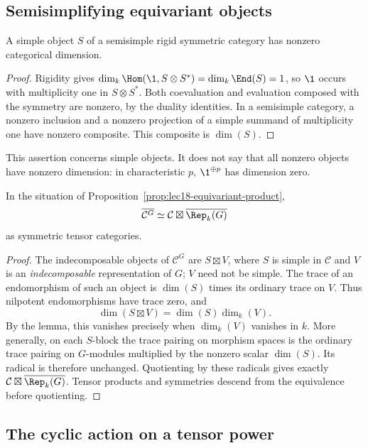 \subsection{Semisimplifying equivariant objects}

\begin{lemma}
A simple object $S$ of a semisimple rigid symmetric category has
nonzero categorical dimension.
\end{lemma}
\begin{proof}
Rigidity gives
$\dim_k\Hom(\1,S\otimes S^*)=\dim_k\End(S)=1$, so $\1$ occurs
with multiplicity one in $S\otimes S^*$. Both coevaluation and
evaluation composed with the symmetry are nonzero, by the duality
identities. In a semisimple category, a nonzero inclusion and a
nonzero projection of a simple summand of multiplicity one have
nonzero composite. This composite is $\dim(S)$.
\end{proof}

This assertion concerns simple objects. It does not say that all
nonzero objects have nonzero dimension: in characteristic $p$,
$\1^{\oplus p}$ has dimension zero.

\begin{proposition}\label{prop:lec18-equivariant-semisimplification}
In the situation of Proposition~\ref{prop:lec18-equivariant-product},
\[
 \overline{\mathcal C^G}
 \simeq\mathcal C\boxtimes\overline{\Rep_k(G)}
\]
as symmetric tensor categories.
\end{proposition}
\begin{proof}
The indecomposable objects of $\mathcal C^G$ are $S\boxtimes V$,
where $S$ is simple in $\mathcal C$ and $V$ is an
\emph{indecomposable} representation of $G$; $V$ need not be simple.
The trace of an endomorphism of such an object is $\dim(S)$ times
its ordinary trace on $V$. Thus nilpotent endomorphisms have trace
zero, and
\[
 \dim(S\boxtimes V)=\dim(S)\dim_k(V).
\]
By the lemma, this vanishes precisely when $\dim_k(V)$ vanishes
in $k$. More generally, on each $S$-block the trace pairing on
morphism spaces is the ordinary trace pairing on $G$-modules
multiplied by the nonzero scalar $\dim(S)$. Its radical is therefore
unchanged. Quotienting by these radicals gives exactly
$\mathcal C\boxtimes\overline{\Rep_k(G)}$. Tensor products and
symmetries descend from the equivalence before quotienting.
\end{proof}

\subsection{The cyclic action on a tensor power}

